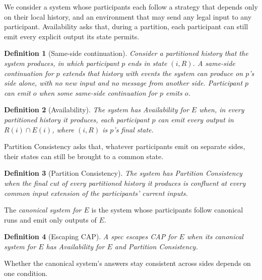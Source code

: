 \documentclass[sigconf]{cidr-2027}
\newtheorem{definition}{Definition}
\theoremstyle{remark}
\newcommand{\indesc}{input extension\xspace} %
\begin{document}
\textcolor{reviewed}{We consider a system whose participants each follow a strategy that depends
only on their local history, and an environment that may send any legal input
to any participant.} \textcolor{reviewed}{Availability asks that, during a partition, each
participant can still emit every explicit output its state permits.}

\begin{definition}[Same-side continuation]
\label{def:local-continuation}
\textcolor{reviewed}{Consider a partitioned history that the system produces, in which participant
$p$ ends in state $(i,R)$.} \textcolor{reviewed}{A \emph{same-side continuation} for $p$ extends that
history with events the system can produce on $p$'s side alone, with no new
input and no message from another side.} \textcolor{reviewed}{Participant $p$ can emit $o$ when some same-side continuation for $p$ emits
$o$.}
\end{definition}

\begin{definition}[Availability]
\label{def:partition-notions}
The system has \emph{Availability for $E$} when, in every partitioned history
it produces, each participant $p$ can emit every output in $R(i)\cap E(i)$,
where $(i,R)$ is $p$'s final state.
\end{definition}

Partition Consistency asks that, whatever participants emit on separate sides,
their states can still be brought to a common state.

\begin{definition}[Partition Consistency]
\label{def:partition-consistency}
\textcolor{reviewed}{The system has \emph{Partition Consistency} when the final cut of every
partitioned history it produces is confluent at every common \indesc of the
participants' current inputs.}
\end{definition}

\textcolor{reviewed}{The \emph{canonical system for $E$} is the system whose participants follow
canonical runs and emit only outputs of $E$.}

\begin{definition}[Escaping CAP]
\label{def:escapes-cap}
\textcolor{reviewed}{A spec \emph{escapes CAP} for $E$ when its canonical system for $E$ has
Availability for $E$ and Partition Consistency.}
\end{definition}

\textcolor{reviewed}{Whether the canonical system's answers stay consistent across sides depends on
one condition.}
\end{document}
